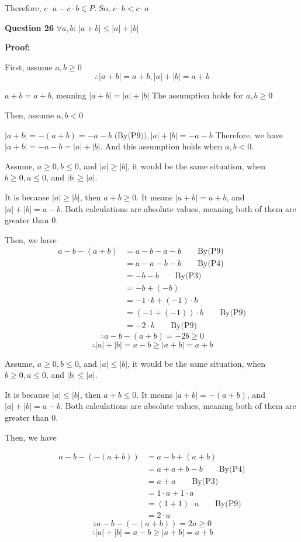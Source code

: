 \documentclass[a4paper,12pt]{report}
\begin{document}
\noindent
Therefore, $c\cdot{a}-c\cdot{b}\in P$. So, $c\cdot{b}<c\cdot{a}$

\noindent
\textbf{Question 26} $\forall a,b$: $|a+b|\leq|a|+|b|$

\noindent
\textbf{Proof:}

\noindent
First, assume $a,b \geq 0$
\[\therefore |a+b| = a+b, |a|+|b|=a+b\]

\noindent
$a+b=a+b$, meaning $|a+b|=|a|+|b|$ The assumption holds for $a,b\geq 0$

\noindent
Then, assume $a,b < 0$

\noindent
$|a+b| = -(a+b)=-a-b\text{ (By(P9))}, |a|+|b| = -a-b$
Therefore, we have $|a+b|=-a-b=|a|+|b|$. And this assumption holds when $a,b < 0$.

\noindent
Assume, $a\geq 0, b\leq 0$, and $|a|\geq|b|$, it would be the same situation, when $b\geq 0, a\leq 0$, and $|b|\geq|a|$.

\noindent 
It is because $|a|\geq|b|$, then $a+b\geq0$. It means $|a+b| =a+b$, and $|a|+|b|=a-b$. Both calculations are absolute values, meaning both of them are greater than 0. 

\noindent
Then, we have  
\begin{align*}
 a-b-(a+b) & = a-b-a-b\qquad\text{By(P9)}\\
 & =a-a-b-b\qquad \text{By(P4)}\\
 & =-b-b\qquad \text{By(P3)}\\
 & =-b+(-b)\\
 & =-1\cdot{b}+(-1)\cdot{b}\\
 & =(-1+(-1))\cdot{b}\qquad \text{By(P9)}\\
 & =-2\cdot{b}\qquad \text{By(P9)}
\end{align*}
\[\therefore a-b-(a+b)=-2b\geq0\]
\[\therefore |a|+|b|=a-b\geq |a+b|=a+b\]

\noindent
Assume, $a\geq 0, b\leq 0$, and $|a|\leq|b|$, it would be the same situation, when $b\geq 0, a\leq 0$, and $|b|\leq|a|$.


\noindent 
It is because $|a|\leq|b|$, then $a+b\leq0$. It means $|a+b| =-(a+b)$, and $|a|+|b|=a-b$. Both calculations are absolute values, meaning both of them are greater than 0. 

Then, we have

\begin{align*}
 a-b-(-(a+b)) & = a-b+(a+b)\\
 & =a+a+b-b\qquad \text{By(P4)}\\
 & =a+a\qquad \text{By(P3)}\\
 & =1\cdot{a}+1\cdot{a}\\
 & =(1+1)\cdot{a}\qquad \text{By(P9)}\\
 & =2\cdot{a}
\end{align*}
\[\therefore a-b-(-(a+b))=2a\geq0\]
\[\therefore |a|+|b|=a-b\geq |a+b|=a+b\]
\end{document}
